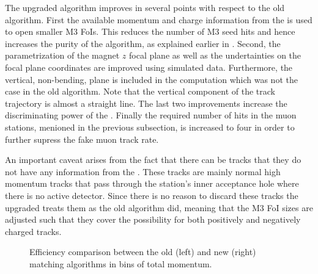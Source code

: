 The upgraded \mvTTm algorithm improves in several points with respect to the old \mvm algorithm.
First the available momentum and charge information from the \ttracker is used to open smaller M3 FoIs.
This reduces the number of M3 seed hits and hence increases the purity of the \mvTTm algorithm,
as explained earlier in . Second, the parametrization of the magnet $z$
focal plane as well as the undertainties on the focal plane coordinates are improved using simulated data.
Furthermore, the vertical, non-bending, plane is included in the \chisq computation which was not the
case in the old \mvm algorithm. Note that the vertical component of the track trajectory is almost a straight
line. The last two improvements increase the discriminating power of the \chisq. Finally the required number
of hits in the muon stations, menioned in the previous subsection, is increased to four in order to further
supress the fake muon track rate.

An important caveat arises from the fact that there can be \velo tracks that they do not have any information from
the \ttracker. These tracks are mainly normal high momentum tracks that pass through the \ttracker station's inner
acceptance hole where there is no active detector. Since there is no reason to discard these tracks the upgraded
\mvTTm treats them as the old \mvm algorithm did, meaning that the M3 FoI sizes are adjusted such that they cover
the possibility for both positively and negatively charged tracks.

\begin{figure}[t]
  \centering
  \begin{subfigure}{0.5\textwidth}
    \raggedright
    \scalebox{.6}{}
    \caption{}
    \label{mvTTm_eff_p}
  \end{subfigure}%
  \hfill%
  \begin{subfigure}{0.5\textwidth}
    \raggedleft
    \scalebox{.6}{}
    \caption{}
    \label{mvm_eff_p}
  \end{subfigure}
  \caption{Efficiency comparison between the old (left) and new (right) matching algorithms in bins of total momentum.}
 \label{mvm_eff_p_comp}
\end{figure}

